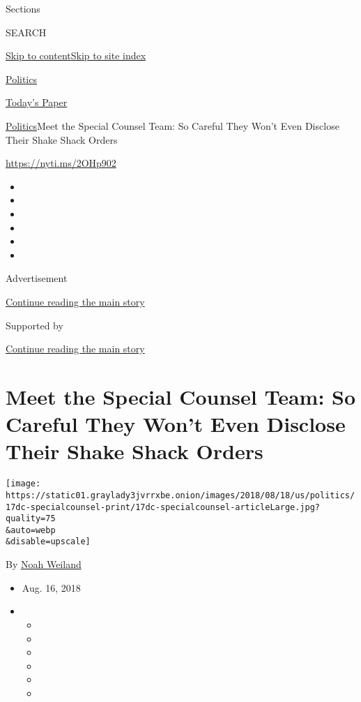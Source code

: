 Sections

SEARCH

\protect\hyperlink{site-content}{Skip to
content}\protect\hyperlink{site-index}{Skip to site index}

\href{https://www.nytimes3xbfgragh.onion/section/politics}{Politics}

\href{https://myaccount.nytimes3xbfgragh.onion/auth/login?response_type=cookie\&client_id=vi}{}

\href{https://www.nytimes3xbfgragh.onion/section/todayspaper}{Today's
Paper}

\href{/section/politics}{Politics}\textbar{}Meet the Special Counsel
Team: So Careful They Won't Even Disclose Their Shake Shack Orders

\url{https://nyti.ms/2OHp902}

\begin{itemize}
\item
\item
\item
\item
\item
\item
\end{itemize}

Advertisement

\protect\hyperlink{after-top}{Continue reading the main story}

Supported by

\protect\hyperlink{after-sponsor}{Continue reading the main story}

\hypertarget{meet-the-special-counsel-team-so-careful-they-wont-even-disclose-their-shake-shack-orders}{%
\section{Meet the Special Counsel Team: So Careful They Won't Even
Disclose Their Shake Shack
Orders}\label{meet-the-special-counsel-team-so-careful-they-wont-even-disclose-their-shake-shack-orders}}

\texttt{[image: https://static01.graylady3jvrrxbe.onion/images/2018/08/18/us/politics/17dc-specialcounsel-print/17dc-specialcounsel-articleLarge.jpg?quality=75\\\&auto=webp\\\&disable=upscale]}

By \href{https://www.nytimes3xbfgragh.onion/by/noah-weiland}{Noah
Weiland}

\begin{itemize}
\item
  Aug. 16, 2018
\item
  \begin{itemize}
  \item
  \item
  \item
  \item
  \item
  \item
  \end{itemize}
\end{itemize}

